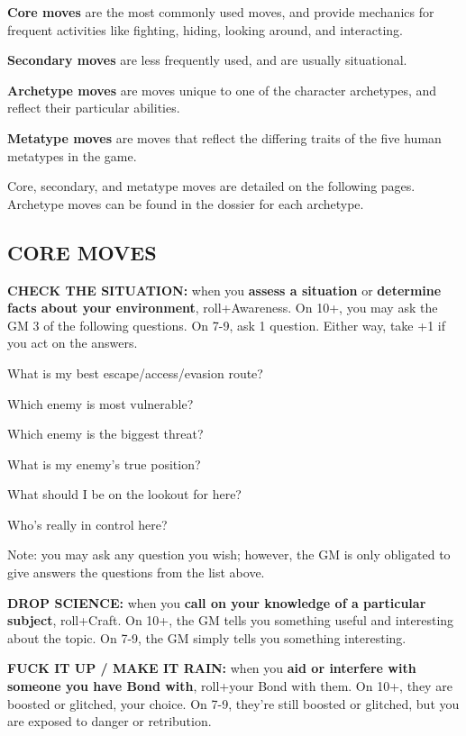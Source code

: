 \documentclass[oneside,10pt]{article}
\begin{document}
\begin{multicols}{2}
\begin{adjustwidth*}{.5cm}{.5cm}
\textbf{Core moves} are the most commonly used moves, and
provide mechanics for frequent activities like
fighting, hiding, looking around, and interacting.

\textbf{Secondary moves} are less frequently used, and are usually
situational.

\textbf{Archetype moves} are moves unique to one
of the character archetypes, and reflect their
particular abilities.

\textbf{Metatype moves} are moves that reflect the differing traits
of the five human metatypes in the game.
\end{adjustwidth*}

Core, secondary, and metatype moves are detailed on the
following pages. Archetype moves can be found in the dossier for each archetype.

\subsection{CORE MOVES}

\textbf{CHECK THE SITUATION:} when you \textbf{assess a situation} or
\textbf{determine facts about your environment}, roll+Awareness.
On 10+, you may ask the GM 3 of the following questions.
On 7-9, ask 1 question. Either way, take +1 if you act on the
answers.
\begin{adjustwidth*}{.5cm}{.5cm}

\tcirc{} What is my best escape/access/evasion route?

\tcirc{} Which enemy is most vulnerable?

\tcirc{} Which enemy is the biggest threat?

\tcirc{} What is my enemy’s true position?

\tcirc{} What should I be on the lookout for here?

\tcirc{} Who’s really in control here?
\end{adjustwidth*}

Note: you may ask any question you wish; however, the GM
is only obligated to give answers the questions from the list
above.

\textbf{DROP SCIENCE:} when you \textbf{call on your knowledge of a
particular subject}, roll+Craft. On 10+, the GM tells you
something useful and interesting about the topic. On 7-9, the
GM simply tells you something interesting.

\textbf{FUCK IT UP / MAKE IT RAIN:} when you \textbf{aid or interfere
with someone you have Bond with}, roll+your Bond with
them. On 10+, they are boosted or glitched, your choice. On
7-9, they’re still boosted or glitched, but you are exposed to
danger or retribution.


\end{multicols}
\end{document}
